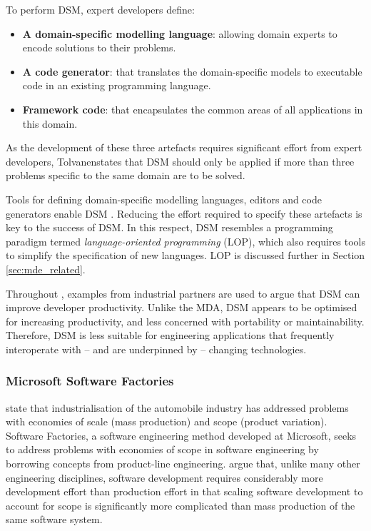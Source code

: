 To perform DSM, expert developers define:

\begin{itemize}
 \item \textbf{A domain-specific modelling language}: allowing domain experts to encode solutions to their problems.
 \item \textbf{A code generator}: that translates the domain-specific models to executable code in an existing programming language.
 \item \textbf{Framework code}: that encapsulates the common areas of all applications in this domain.
\end{itemize}

As the development of these three artefacts requires significant effort from expert developers, Tolvanen\footnotemark[\value{footnote}] states that DSM should only be applied if more than three problems specific to the same domain are to be solved.

Tools for defining domain-specific modelling languages, editors and code generators enable DSM \cite{kelly08dsm}. Reducing the effort required to specify these artefacts is key to the success of DSM. In this respect, DSM resembles a programming paradigm termed \textit{language-oriented programming} (LOP), which also requires tools to simplify the specification of new languages. LOP is discussed further in Section \ref{sec:mde_related}.

Throughout \cite{kelly08dsm}, examples from industrial partners are used to argue that DSM can improve developer productivity. Unlike the MDA, DSM appears to be optimised for increasing productivity, and less concerned with portability or maintainability. Therefore, DSM is less suitable for engineering applications that frequently interoperate with -- and are underpinned by -- changing technologies.

\subsubsection{Microsoft Software Factories}
\cite[pg159]{greenfield04software} state that industrialisation of the automobile industry has addressed problems with economies of scale (mass production) and scope (product variation). Software Factories, a software engineering method developed at Microsoft, seeks to address problems with economies of scope in software engineering by borrowing concepts from product-line engineering. \cite{greenfield04software} argue that, unlike many other engineering disciplines, software development requires considerably more development effort than production effort in that scaling software development to account for scope is significantly more complicated than mass production of the same software system.

